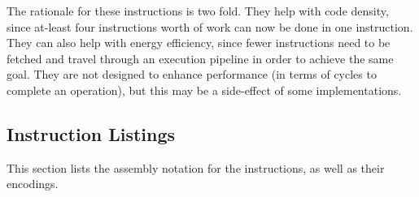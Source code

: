 The rationale for these instructions is two fold. They help with code density,
since at-least four instructions worth of work can now be done
in one instruction. They can also help with energy efficiency, since fewer
instructions need to be fetched and travel through an execution pipeline in
order to achieve the same goal. They are not designed to enhance performance
(in terms of cycles to complete an operation), but this may be a side-effect
of some implementations.

\newpage
\subsection{Instruction Listings}

This section lists the assembly notation for the instructions, as well as
their encodings.

